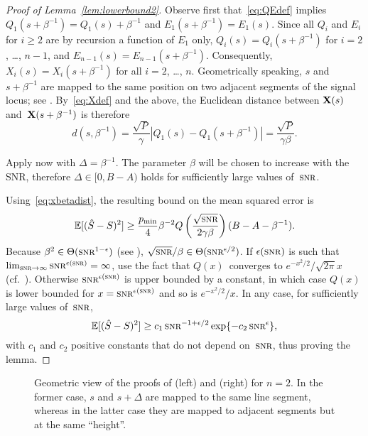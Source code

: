 \begin{proof}[Proof of Lemma~\ref{lem:lowerbound2}]
  Observe first that~\eqref{eq:QEdef} implies $Q_1(s + \beta^{-1}) = Q_1(s) +
  \beta^{-1}$ and $E_1(s + \beta^{-1}) = E_1(s)$. Since all $Q_i$ and $E_i$ for
  $i \ge 2$ are by recursion a function of $E_1$ only, $Q_i(s) = Q_i(s +
  \beta^{-1})$ for $i = 2$, \dots, $n-1$, and $E_{n-1}(s) = E_{n-1}(s +
  \beta^{-1})$. Consequently,  $X_i(s) = X_i(s + \beta^{-1})$ for all $i =
  2$, \dots, $n$. Geometrically speaking, $s$ and $s + \beta^{-1}$ are mapped to
  the same position on two adjacent segments of the signal locus; see
  . By~\eqref{eq:Xdef} and the above, the Euclidean distance
  between $\mathbf{X}(s)$ and~$\mathbf{X}(s+\beta^{-1})$ is therefore
  \begin{equation}
    \label{eq:xbetadist}
    d(s, \beta^{-1}) = \frac{\sqrt P}{\gamma} |Q_1(s) - Q_1(s+\beta^{-1})| 
    = \frac{\sqrt P}{\gamma\beta}.
  \end{equation}

  Apply now  with $\Delta = \beta^{-1}$. The
  parameter $\beta$ will be chosen to increase with the SNR, therefore $\Delta
  \in [0, B-A)$ holds for sufficiently large values of~$\snr$.

  Using~\eqref{eq:xbetadist}, the resulting bound on the mean squared error is
  \begin{equation*}
    \mse \ge \frac{\pmin}{4} \beta^{-2}
    Q\left (\frac{\sqrt{\snr}}{2\gamma\beta}  \right) (B-A-\beta^{-1}
    ).
  \end{equation*}
  Because $\beta^2 \in \Theta(\snr^{1-\e})$ (see ),
  $\sqrt{\snr}/\beta \in \Theta(\snr^{\e/2})$. If $\e(\snr)$ is such that
  $\limtoinf{\snr} \snr^{\e(\snr)} = \infty$, use the fact that $Q(x)$~converges
  to $e^{-x^2/2}/\sqrt{2\pi}x$ (cf.~\cite[.12]{AbramowitzS1964}).
  Otherwise $\snr^{\e(\snr)}$ is upper bounded by a constant, in which case
  $Q(x)$ is lower bounded for $x = \snr^{\e(\snr)}$ and so is $e^{-x^2/2}/x$.
  In any case, for sufficiently large values of~$\snr$,
  \begin{equation*}
    \mse \ge c_1 \snr^{-1 + \e/2} \exp\{-c_2\snr^\e\},
  \end{equation*}
  with $c_1$ and $c_2$ positive constants that do not depend on~$\snr$, thus
  proving the lemma.
\end{proof}

\begin{figure}
  \centerline{%
  \subfloat[$\Delta \in [0, \beta^{-(n-1)})$ and $s \in \I_j^\Delta$]%
  {\label{fig:sdrubproofa}}%
  \hfil
  \subfloat[$\Delta =
  \beta^{-1}$]{\label{fig:sdrubproofb}}
  } %
  \caption{Geometric view of the proofs of  (left) and
   (right) for $n = 2$. In the former case, $s$ and $s +
  \Delta$ are mapped to the same line segment, whereas in the latter case they
  are mapped to adjacent segments but at the same ``height''.}
  \label{fig:sdrubproof}
\end{figure}


